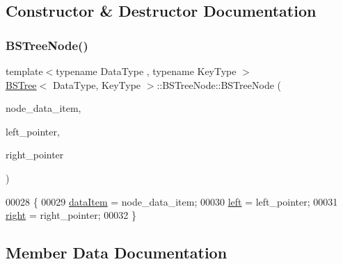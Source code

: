 \subsection{Constructor \& Destructor Documentation}
\hypertarget{class_b_s_tree_1_1_b_s_tree_node_a083eecbe3e2421ca811a05e1e8ba1203}{}\label{class_b_s_tree_1_1_b_s_tree_node_a083eecbe3e2421ca811a05e1e8ba1203} 
\subsubsection{\texorpdfstring{B\+S\+Tree\+Node()}{BSTreeNode()}}
{\footnotesize\ttfamily template$<$typename Data\+Type , typename Key\+Type $>$ \\
\hyperlink{class_b_s_tree}{B\+S\+Tree}$<$ Data\+Type, Key\+Type $>$\+::B\+S\+Tree\+Node\+::\+B\+S\+Tree\+Node (\begin{DoxyParamCaption}\item[{const Data\+Type \&}]{node\+\_\+data\+\_\+item,  }\item[{\hyperlink{class_b_s_tree_1_1_b_s_tree_node}{B\+S\+Tree\+Node} $\ast$}]{left\+\_\+pointer,  }\item[{\hyperlink{class_b_s_tree_1_1_b_s_tree_node}{B\+S\+Tree\+Node} $\ast$}]{right\+\_\+pointer }\end{DoxyParamCaption})}


\begin{DoxyCode}
00028 \{
00029     \hyperlink{class_b_s_tree_1_1_b_s_tree_node_a507c8d6dde1b8d35d9af6b4e78f38962}{dataItem} = node\_data\_item;
00030     \hyperlink{class_b_s_tree_1_1_b_s_tree_node_a7a90150dd249432e240dc363955c5ca1}{left} = left\_pointer;
00031     \hyperlink{class_b_s_tree_1_1_b_s_tree_node_a8d7bfd0208a562c8b8ab332e1d796563}{right} = right\_pointer;
00032 \}
\end{DoxyCode}


\subsection{Member Data Documentation}
\hypertarget{class_b_s_tree_1_1_b_s_tree_node_a507c8d6dde1b8d35d9af6b4e78f38962}{}\label{class_b_s_tree_1_1_b_s_tree_node_a507c8d6dde1b8d35d9af6b4e78f38962} 
